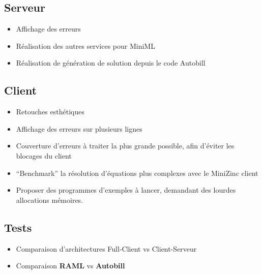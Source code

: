 \documentclass[12pt]{article}
\begin{document}
\hypertarget{serveur}{%
      \subsection{Serveur}\label{serveur}}

\begin{itemize}
      \tightlist
      \item
            Affichage des erreurs
      \item
            Réalisation des autres services pour MiniML
      \item
            Réalisation de génération de solution depuis le code Autobill
\end{itemize}

\hypertarget{client}{%
      \subsection{Client}\label{client}}

\begin{itemize}
      \tightlist
      \item
            Retouches esthétiques
      \item
            Affichage des erreurs sur plusieurs lignes
      \item
            Couverture d'erreurs à traiter la plus grande possible, afin d'éviter
            les blocages du client
      \item
            ``Benchmark'' la résolution d'équations plus complexes avec le
            MiniZinc client
      \item
            Proposer des programmes d'exemples à lancer, demandant des lourdes
            allocations mémoires.
\end{itemize}

\hypertarget{tests}{%
      \subsection{Tests}\label{tests}}

\begin{itemize}
      \item
            Comparaison d'architectures Full-Client vs Client-Serveur
      \item
            Comparaison \textbf{RAML} vs \textbf{Autobill}
\end{itemize}

\newpage



\end{document}

